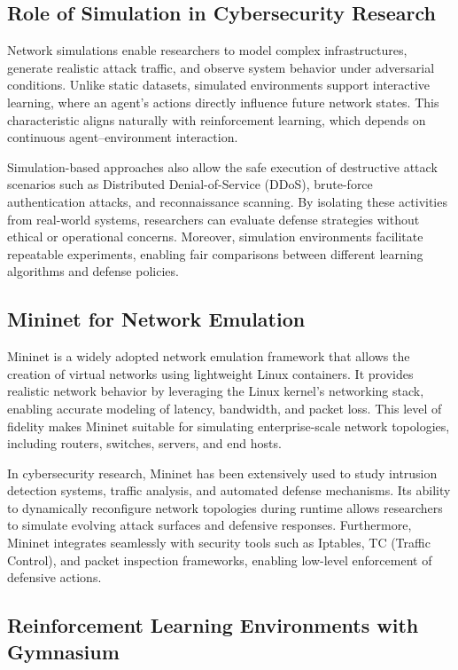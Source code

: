 \documentclass[12pt,a4paper]{report}
\begin{document}
\subsection{Role of Simulation in Cybersecurity Research}

Network simulations enable researchers to model complex infrastructures, generate realistic attack traffic, and observe system behavior under adversarial conditions.
Unlike static datasets, simulated environments support interactive learning, where an agent’s actions directly influence future network states.
This characteristic aligns naturally with reinforcement learning, which depends on continuous agent–environment interaction.

Simulation-based approaches also allow the safe execution of destructive attack scenarios such as Distributed Denial-of-Service (DDoS), brute-force authentication attacks, and reconnaissance scanning.
By isolating these activities from real-world systems, researchers can evaluate defense strategies without ethical or operational concerns.
Moreover, simulation environments facilitate repeatable experiments, enabling fair comparisons between different learning algorithms and defense policies.

\subsection{Mininet for Network Emulation}

Mininet is a widely adopted network emulation framework that allows the creation of virtual networks using lightweight Linux containers.
It provides realistic network behavior by leveraging the Linux kernel’s networking stack, enabling accurate modeling of latency, bandwidth, and packet loss.
This level of fidelity makes Mininet suitable for simulating enterprise-scale network topologies, including routers, switches, servers, and end hosts.

In cybersecurity research, Mininet has been extensively used to study intrusion detection systems, traffic analysis, and automated defense mechanisms.
Its ability to dynamically reconfigure network topologies during runtime allows researchers to simulate evolving attack surfaces and defensive responses.
Furthermore, Mininet integrates seamlessly with security tools such as Iptables, TC (Traffic Control), and packet inspection frameworks, enabling low-level enforcement of defensive actions.

\subsection{Reinforcement Learning Environments with Gymnasium}
\end{document}

